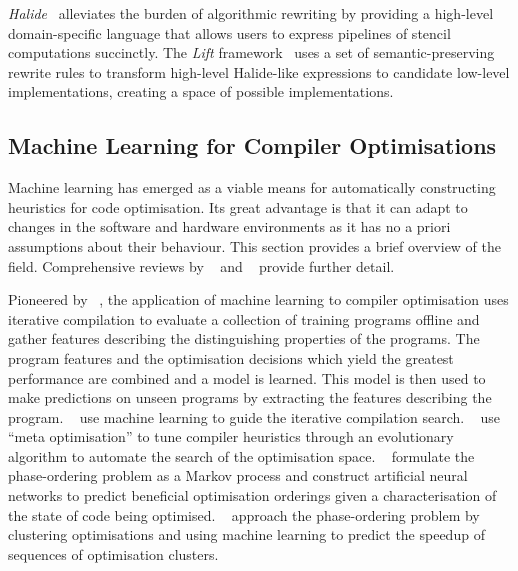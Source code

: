 \emph{Halide}~\cite{Ragan-Kelley2013} alleviates the burden of algorithmic rewriting by providing a high-level domain-specific language that allows users to express pipelines of stencil computations succinctly. The \emph{Lift} framework~\cite{Steuwer2017} uses a set of semantic-preserving rewrite rules to transform high-level Halide-like expressions to candidate low-level implementations, creating a space of possible implementations.


\subsection{Machine Learning for Compiler Optimisations}
\label{subsec:related-work-machine-learning-optimisation}

Machine learning has emerged as a viable means for automatically constructing heuristics for code optimisation. Its great advantage is that it can adapt to changes in the software and hardware environments as it has no a priori assumptions about their behaviour. This section provides a brief overview of the field. Comprehensive reviews by \citeauthor{Ashouri2018}~\cite{Ashouri2018} and \citeauthor{Zhang2018}~\cite{Zhang2018} provide further detail.

Pioneered by \citeauthor{Agakov}~\cite{Agakov}, the application of machine learning to compiler optimisation uses iterative compilation to evaluate a collection of training programs offline and gather features describing the distinguishing properties of the programs. The program features and the optimisation decisions which yield the greatest performance are combined and a model is learned. This model is then used to make predictions on unseen programs by extracting the features describing the program. \citeauthor{Agakov}~\cite{Agakov} use machine learning to guide the iterative compilation search. \citeauthor{Stephenson2003}~\cite{Stephenson2003} use ``meta optimisation'' to tune compiler heuristics through an evolutionary algorithm to automate the search of the optimisation space. \citeauthor{Kulkarni2012}~\cite{Kulkarni2012} formulate the phase-ordering problem as a Markov process and construct artificial neural networks to predict beneficial optimisation orderings given a characterisation of the state of code being optimised. \citeauthor{Ashouri2017}~\cite{Ashouri2017} approach the phase-ordering problem by clustering optimisations and using machine learning to predict the speedup of sequences of optimisation clusters.


